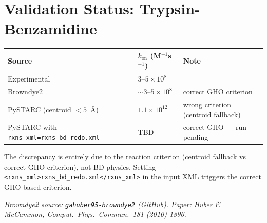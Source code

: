 \documentclass[12pt,a4paper]{article}
\begin{document}
\section{Validation Status: Trypsin-Benzamidine}

\begin{table}[H]\centering\small
\begin{tabular}{lll}\toprule
Source & $k_\mathrm{on}$ (M$^{-1}$s$^{-1}$) & Note\\\midrule
Experimental & $3$--$5\times10^8$ & \\
Browndye2 & $\sim3$--$5\times10^8$ & correct GHO criterion\\
PySTARC (centroid $<5$~\AA) & $1.1\times10^{12}$ & wrong criterion (centroid fallback)\\
PySTARC with \texttt{rxns\_xml=rxns\_bd\_redo.xml} & TBD & correct GHO — run pending\\\bottomrule
\end{tabular}
\end{table}

The discrepancy is entirely due to the reaction criterion (centroid fallback
vs correct GHO criterion), not BD physics. Setting
\texttt{<rxns\_xml>rxns\_bd\_redo.xml</rxns\_xml>} in the input XML
triggers the correct GHO-based criterion.

\vfill
\noindent\small
\textit{Browndye2 source: \texttt{gahuber95-browndye2} (GitHub).
Paper: Huber \& McCammon, \textit{Comput.\ Phys.\ Commun.}\ 181 (2010) 1896.}
\end{document}
